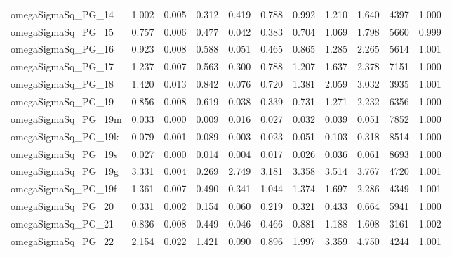 \documentclass[12pt]{article}
\begin{document}
\begin{longtable}{lrrrrrrrrrr}
omegaSigmaSq\_PG\_14  & 1.002 & 0.005 & 0.312 & 0.419 & 0.788 & 0.992 & 1.210 & 1.640 &  4397 & 1.000 \\
omegaSigmaSq\_PG\_15  & 0.757 & 0.006 & 0.477 & 0.042 & 0.383 & 0.704 & 1.069 & 1.798 &  5660 & 0.999 \\
omegaSigmaSq\_PG\_16  & 0.923 & 0.008 & 0.588 & 0.051 & 0.465 & 0.865 & 1.285 & 2.265 &  5614 & 1.001 \\
omegaSigmaSq\_PG\_17  & 1.237 & 0.007 & 0.563 & 0.300 & 0.788 & 1.207 & 1.637 & 2.378 &  7151 & 1.000 \\
omegaSigmaSq\_PG\_18  & 1.420 & 0.013 & 0.842 & 0.076 & 0.720 & 1.381 & 2.059 & 3.032 &  3935 & 1.001 \\
omegaSigmaSq\_PG\_19  & 0.856 & 0.008 & 0.619 & 0.038 & 0.339 & 0.731 & 1.271 & 2.232 &  6356 & 1.000 \\
omegaSigmaSq\_PG\_19m & 0.033 & 0.000 & 0.009 & 0.016 & 0.027 & 0.032 & 0.039 & 0.051 &  7852 & 1.000 \\
omegaSigmaSq\_PG\_19k & 0.079 & 0.001 & 0.089 & 0.003 & 0.023 & 0.051 & 0.103 & 0.318 &  8514 & 1.000 \\
omegaSigmaSq\_PG\_19s & 0.027 & 0.000 & 0.014 & 0.004 & 0.017 & 0.026 & 0.036 & 0.061 &  8693 & 1.000 \\
omegaSigmaSq\_PG\_19g & 3.331 & 0.004 & 0.269 & 2.749 & 3.181 & 3.358 & 3.514 & 3.767 &  4720 & 1.001 \\
omegaSigmaSq\_PG\_19f & 1.361 & 0.007 & 0.490 & 0.341 & 1.044 & 1.374 & 1.697 & 2.286 &  4349 & 1.001 \\
omegaSigmaSq\_PG\_20  & 0.331 & 0.002 & 0.154 & 0.060 & 0.219 & 0.321 & 0.433 & 0.664 &  5941 & 1.000 \\
omegaSigmaSq\_PG\_21  & 0.836 & 0.008 & 0.449 & 0.046 & 0.466 & 0.881 & 1.188 & 1.608 &  3161 & 1.002 \\
omegaSigmaSq\_PG\_22  & 2.154 & 0.022 & 1.421 & 0.090 & 0.896 & 1.997 & 3.359 & 4.750 &  4244 & 1.001 \\
\end{longtable}
\endgroup


\newpage
\end{document}
